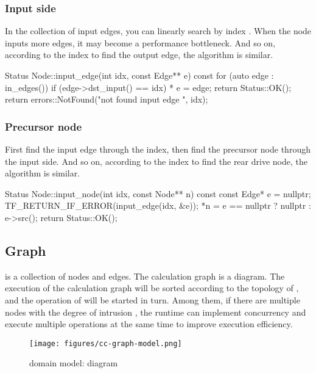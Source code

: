\begin{content}
\subsubsection{Input side}
In the collection of input edges, you can linearly search by index . When the node inputs more edges, it may become a performance bottleneck. And so on, according to the index  to find the output edge, the algorithm is similar.

\begin{leftbar}
\begin{c++}
Status Node::input_edge(int idx, const Edge** e) const {
  for (auto edge : in_edges()) {
    if (edge->dst_input() == idx) {
      * e = edge;
      return Status::OK();
    }
  }
  return errors::NotFound("not found input edge ", idx);
}
\end{c++}
\end{leftbar}


\subsubsection{Precursor node}
First find the input edge through the  index, then find the precursor node through the input side. And so on, according to the index to find the rear drive node, the algorithm is similar.

\begin{leftbar}
\begin{c++}
Status Node::input_node(int idx, const Node** n) const {
  const Edge* e = nullptr;
  TF_RETURN_IF_ERROR(input_edge(idx, &e));
  *n = e == nullptr ? nullptr : e->src();
  return Status::OK();
}
\end{c++}
\end{leftbar}


\subsection{Graph}
 is a collection of nodes and edges. The calculation graph is a  diagram. The execution of the calculation graph will be sorted according to the topology of , and the operation of  will be started in turn. Among them, if there are multiple nodes with the degree of intrusion , the  runtime can implement concurrency and execute multiple  operations at the same time to improve execution efficiency.

\begin{figure}[H]
  \centering
  \texttt{[image: figures/cc-graph-model.png]}
  \caption{domain model: diagram}
  \label{fig:cc-graph-model}
\end{figure}



\end{content}
